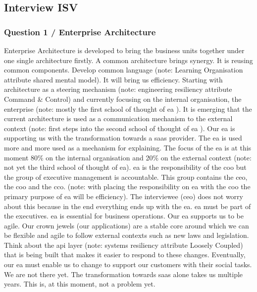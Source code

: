 \subsection{Interview ISV}
\label{sub:interviewisv}
\subsubsection{Question 1 / Enterprise Architecture}
Enterprise Architecture is developed to bring the business units together under one single architecture firstly. A common architecture brings synergy. It is reusing common components. Develop common language (note: Learning Organisation attribute shared mental model). It will bring us efficiency. Starting with architecture as a steering mechanism (note: engineering \gls{resiliency} attribute Command \& Control) and currently focusing on the internal organisation, the enterprise (note: mostly the first school of thought of \acrshort{ea} \parencite{Lapalme2012}). It is emerging that the current architecture is used as a communication mechanism to the external context (note: first steps into the second school of thought of \acrshort{ea} \parencite{Lapalme2012}). Our \acrshort{ea} is supporting us with the transformation towards a \acrfull{saas} provider. The \acrshort{ea} is used more and more used as a mechanism for explaining. The focus of the \acrshort{ea} is at this moment 80\% on the internal organisation and 20\% on the external context (note: not yet the third school of thought of \acrshort{ea}).
\acrshort{ea} is the responsibility of the \acrfull{coo} but the group of executive management is accountable. This group contains the \acrfull{ceo}, the \acrshort{coo} and the \acrfull{cco}. (note: with placing the responsibility on \acrshort{ea} with the \acrshort{coo} the primary purpose of \acrshort{ea} will be efficiency). The interviewee (\acrshort{ceo}) does not worry about this because in the end everything ends up with the \acrshort{ea}. \acrshort{ea} must be part of the executives. \acrshort{ea} is essential for business operations.
Our \acrshort{ea} supports us to be agile. Our crown jewels (our applications) are a stable core around which we can be flexible and agile to follow external contexts such as new laws and legislation. Think about the \acrfull{api} layer (note: systems \gls{resiliency} attribute Loosely Coupled) that is being built that makes it easier to respond to these changes. Eventually, our \acrshort{ea} must enable us to change to support our customers with their social tasks. We are not there yet. The transformation towards \acrfull{saas} alone takes us multiple years. This is, at this moment, not a problem yet.
